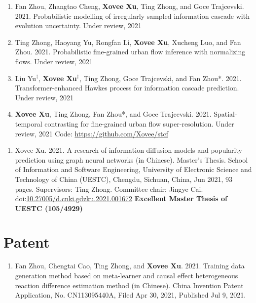 
\begin{enumerate}[resume]
    \item Fan Zhou, Zhangtao Cheng, \textbf{Xovee Xu}, Ting Zhong, and Goce Trajcevski. 2021. Probabilistic modelling of irregularly sampled information cascade with evolution uncertainty. Under review, 2021
    \item Ting Zhong, Haoyang Yu, Rongfan Li, \textbf{Xovee Xu}, Xucheng Luo, and Fan Zhou. 2021. Probabilistic fine-grained urban flow inference with normalizing flows. Under review, 2021
    \item Liu Yu$^\dagger$, \textbf{Xovee Xu}$^\dagger$, Ting Zhong, Goce Trajcevski, and Fan Zhou*. 2021. Transformer-enhanced Hawkes process for information cascade prediction. Under review, 2021
    \item \textbf{Xovee Xu}, Ting Zhong, Fan Zhou*, and Goce Trajcevski. 2021. Spatial-temporal contrasting for fine-grained urban flow super-resolution. Under review, 2021 \newline Code: {\url{https://github.com/Xovee/stcf}}
\end{enumerate}


\begin{enumerate}
    \item Xovee Xu. 2021. A research of information diffusion models and popularity prediction using graph neural networks (in Chinese). Master's Thesis. School of Information and Software Engineering, University of Electronic Science and Technology of China (UESTC), Chengdu, Sichuan, China, Jun 2021, 93 pages. Supervisors: Ting Zhong. Committee chair: Jingye Cai. doi:\href{https://doi.org/10.27005/d.cnki.gdzku.2021.001672}{10.27005/d.cnki.gdzku.2021.001672}\newline
    \textbf{\color{red}Excellent Master Thesis of UESTC (105/4929)}
\end{enumerate}

\section*{Patent}

\begin{enumerate}
    \item Fan Zhou, Chengtai Cao, Ting Zhong, and \textbf{Xovee Xu}. 2021. Training data generation method based on meta-learner and causal effect heterogeneous reaction difference estimation method (in Chinese). China Invention Patent Application, No. CN113095440A, Filed Apr 30, 2021, Published Jul 9, 2021. 
\end{enumerate}